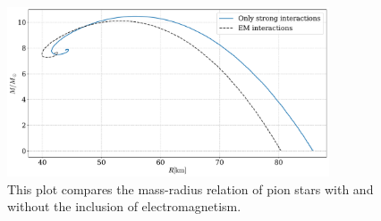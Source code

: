 \begin{figure}[!htb]
    \centering
    \includegraphics[width=0.85\textwidth]{../scripts/figurer/pion_star/mass_radius_pion_star_compare.pdf}
    \caption{
        This plot compares the mass-radius relation of pion stars with and without the inclusion of electromagnetism.
        }
        \label{fig: mass-radius relation comparison}
\end{figure}

